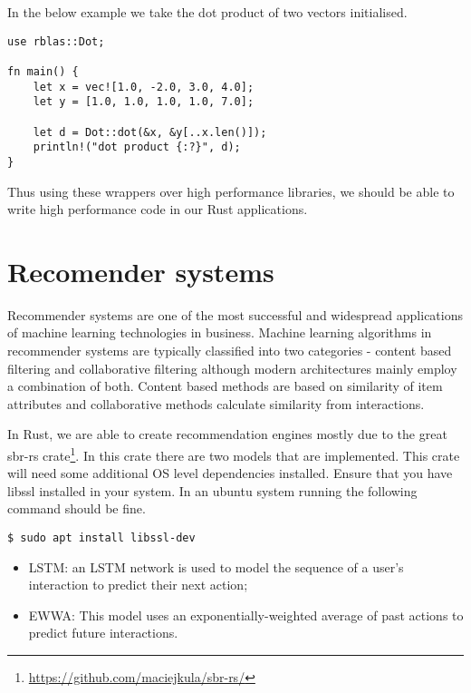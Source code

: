 \documentclass{book}
\begin{document}
In the below example we take the dot product of two vectors initialised.

\begin{lstlisting}[caption={chapter7/high-performance-computing/src/main.rs}, basicstyle=\small]
use rblas::Dot;

fn main() {
    let x = vec![1.0, -2.0, 3.0, 4.0];
    let y = [1.0, 1.0, 1.0, 1.0, 7.0];

    let d = Dot::dot(&x, &y[..x.len()]);
    println!("dot product {:?}", d);
}
\end{lstlisting}

Thus using these wrappers over high performance libraries, we should be able to write high performance code in our Rust applications.



\label{sec:gpu}

\section{Recomender systems}%
Recommender systems are one of the most successful and widespread applications of machine learning technologies in business. Machine learning algorithms in recommender systems are typically classified into two categories - content based filtering and collaborative filtering although modern architectures mainly employ a combination of both. Content based methods are based on similarity of item attributes and collaborative methods calculate similarity from interactions.

In Rust, we are able to create recommendation engines mostly due to the great sbr-rs crate\footnote{\href{}{https://github.com/maciejkula/sbr-rs/}}. In this crate there are two models that are implemented.  This crate will need some additional OS level dependencies installed. Ensure that you have libssl installed in your system. In an ubuntu system running the following command should be fine.

\begin{lstlisting}[caption={}, basicstyle=\small]
$ sudo apt install libssl-dev
\end{lstlisting}

\begin{itemize}
	\item LSTM: an LSTM network is used to model the sequence of a user's interaction to predict their next action;
	\item EWWA: This model uses an exponentially-weighted average of past actions to predict future interactions.
\end{itemize}
\end{document}
